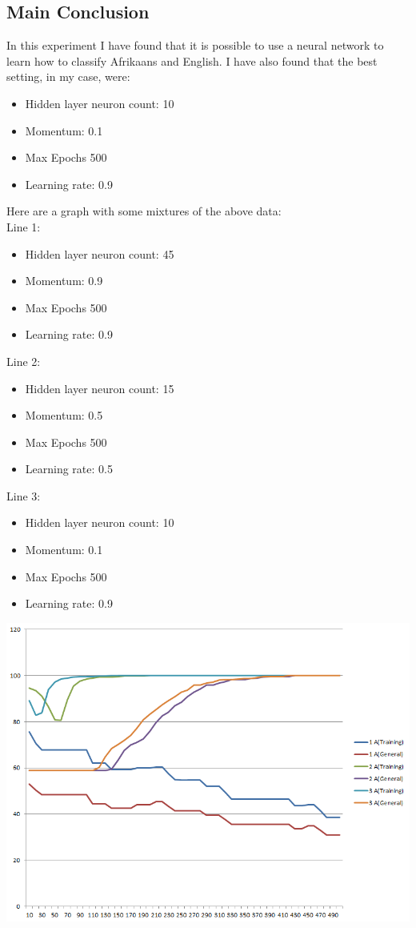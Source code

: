 \documentclass[pdftex,10pt,a4paper]{report}
\begin{document}
\subsection{Main Conclusion}
In this experiment I have found that it is possible to use a neural network to learn how to classify Afrikaans and English. I have also found that the best setting, in my case, were:
\begin{itemize}
	\item Hidden layer neuron count: 10
	\item Momentum: 0.1
	\item Max Epochs 500 
	\item Learning rate: 0.9  
\end{itemize}

Here are a graph with some mixtures of the above data:\\
Line 1:
\begin{itemize}
	\item Hidden layer neuron count: 45
	\item Momentum: 0.9
	\item Max Epochs 500 
	\item Learning rate: 0.9  
\end{itemize}
Line 2:
\begin{itemize}
	\item Hidden layer neuron count: 15
	\item Momentum: 0.5
	\item Max Epochs 500 
	\item Learning rate: 0.5  
\end{itemize}
Line 3:
\begin{itemize}
	\item Hidden layer neuron count: 10
	\item Momentum: 0.1
	\item Max Epochs 500 
	\item Learning rate: 0.9  
\end{itemize}
\begin{center}
	\includegraphics[scale=0.7]{charts/final}
\end{center}
\end{document}
